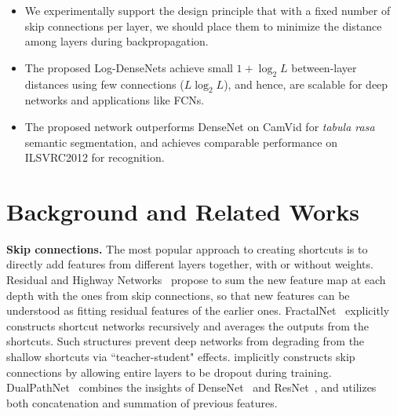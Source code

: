 \documentclass{article}
\newcommand{\logdenses}{Log-DenseNets\xspace}
\begin{document}
\begin{itemize}
    \item We experimentally support the design principle that with a fixed number of skip connections per layer, we should place them to minimize the distance among layers during backpropagation. 
    \item The proposed \logdenses achieve small $1 + \log_2 L$ between-layer distances using few connections ($L\log_2 L$), and hence, are scalable for deep networks and applications like FCNs.
    \item The proposed network outperforms DenseNet on CamVid for \textit{tabula rasa}  semantic segmentation, and achieves comparable performance on ILSVRC2012 for recognition.
\end{itemize}

\section{Background and Related Works}
\label{sec:background}

\textbf{Skip connections.}
The most popular approach to creating shortcuts is to directly add features from different layers together, with or without weights. Residual and Highway Networks~\citep{resnet, highwaynet} propose to sum the new feature map at each depth with the ones from skip connections, so that new features can be understood as fitting residual features of the earlier ones. FractalNet~\citep{fractalnet} explicitly constructs shortcut networks recursively and averages the outputs from the shortcuts. Such structures prevent deep networks from degrading from the shallow shortcuts via ``teacher-student" effects. \citep{dropoutnet} implicitly constructs skip connections by allowing entire layers to be dropout during training. 
DualPathNet~\citep{dualpathnet} combines the insights of DenseNet~\citep{densenet} and ResNet~\citep{resnet}, and utilizes both concatenation and summation of previous features. 
\end{document}
